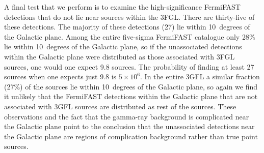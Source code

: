 \documentclass[useAMS,usenatbib]{mn2e}
\begin{document}
A final test that we perform is to examine the high-significance
FermiFAST detections that do not lie near sources within the 3FGL.
There are thirty-five of these detections.  The majority of these
detections (27) lie within 10~degrees of the Galactic plane.  Among
the entire five-sigma FermiFAST catalogue only 28\% lie within
10~degrees of the Galactic plane, so if the unassociated detections
within the Galactic plane were distributed as those associated with
3FGL sources, one would one expect 9.8 sources.  The probability of
finding at least 27 sources when one expects just 9.8 is $5\times
10^6$.  In the entire 3GFL a similar fraction (27\%) of the sources
lie within 10~degrees of the Galactic plane, so again we find it
unlikely that the FermiFAST detections within the Galactic plane that
are not associated with 3GFL sources are distributed as rest of the
sources.  These observations and the fact that the gamma-ray
background is complicated near the Galactic plane point to the
conclusion that the unassociated detections near the Galactic plane are
regions of complication background rather than true point sources.
\end{document}
